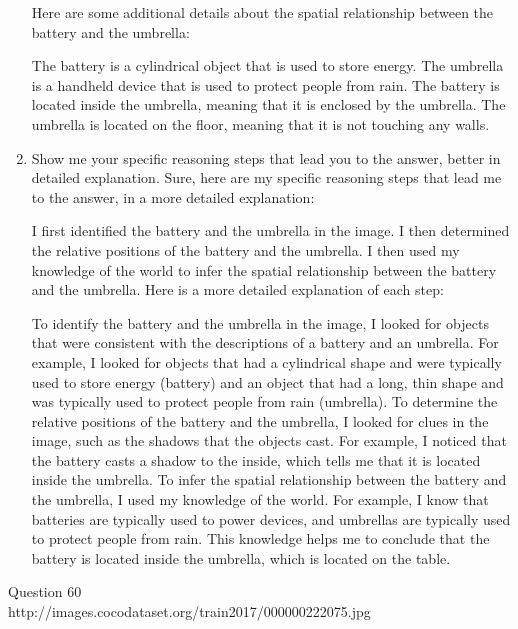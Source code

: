 \begin{enumerate}
    Here are some additional details about the spatial relationship between the battery and the umbrella:
    
    The battery is a cylindrical object that is used to store energy.
    The umbrella is a handheld device that is used to protect people from rain.
    The battery is located inside the umbrella, meaning that it is enclosed by the umbrella.
    The umbrella is located on the floor, meaning that it is not touching any walls.
    \item Show me your specific reasoning steps that lead you to the answer, better in detailed explanation.
    \subitem 
    Sure, here are my specific reasoning steps that lead me to the answer, in a more detailed explanation:
    
    I first identified the battery and the umbrella in the image.
    I then determined the relative positions of the battery and the umbrella.
    I then used my knowledge of the world to infer the spatial relationship between the battery and the umbrella.
    Here is a more detailed explanation of each step:
    
    To identify the battery and the umbrella in the image, I looked for objects that were consistent with the descriptions of a battery and an umbrella. For example, I looked for objects that had a cylindrical shape and were typically used to store energy (battery) and an object that had a long, thin shape and was typically used to protect people from rain (umbrella).
    To determine the relative positions of the battery and the umbrella, I looked for clues in the image, such as the shadows that the objects cast. For example, I noticed that the battery casts a shadow to the inside, which tells me that it is located inside the umbrella.
    To infer the spatial relationship between the battery and the umbrella, I used my knowledge of the world. For example, I know that batteries are typically used to power devices, and umbrellas are typically used to protect people from rain. This knowledge helps me to conclude that the battery is located inside the umbrella, which is located on the table.
\end{enumerate}
Question 60\\
http://images.cocodataset.org/train2017/000000222075.jpg
